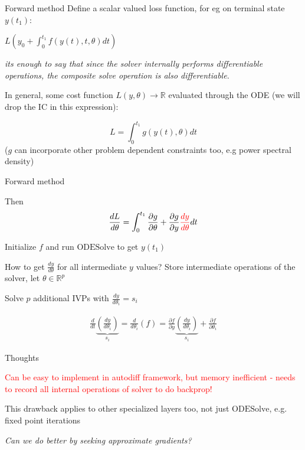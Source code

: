 \documentclass[usenames,dvipsnames]{beamer}
\theoremstyle{definition}
\begin{document}
\begin{frame}{Forward method}
    Define a scalar valued loss function, for eg on terminal state $y(t_1)$:

    $L(y_0 + \int_{0}^{t_1}f(y(t), t, \theta)dt)$

    \emph{its enough to say that since the solver internally performs differentiable operations, the composite solve operation is also differentiable.}

    In general, some cost function $L(y, \theta) \rightarrow \mathbb{R}$ evaluated through the ODE (we will drop the IC in this expression):

    $$L = \int_{0}^{t_1}g(y(t), \theta)dt$$ ($g$ can incorporate other problem dependent constraints too, e.g power spectral density)   
\end{frame}

\begin{frame}{Forward method}

    Then $$\frac{dL}{d\theta} = \int_{0}^{t_1}\frac{\partial g}{\partial \theta} + \frac{\partial g}{\partial y} \textcolor{red}{\frac{dy}{d\theta}} dt$$

    Initialize $f$ and run $\textrm{ODESolve}$ to get $y(t_1)$

    How to get $\frac{dy}{d\theta}$ for all intermediate $y$ values? Store intermediate operations of the solver, let $\theta \in \mathbb{R}^{p}$

    Solve $p$ additional IVPs with $\frac{dy}{d\theta_i} = s_i$ 

    $$\begin{aligned}\frac{d}{dt}\underbrace{\left(\frac{dy}{d\theta_i}\right)}_{s_i} = \frac{d}{d\theta_i}(f) = \frac{\partial f}{\partial y}\underbrace{\left(\frac{dy}{d\theta_i}\right)}_{s_i} + \frac{\partial f}{\partial \theta_i}\end{aligned}$$

\end{frame}

\begin{frame}{Thoughts}

    \textcolor{red}{Can be easy to implement in autodiff framework, but memory inefficient - needs to record all internal operations of solver to do backprop!}


    This drawback applies to other specialized layers too, not just $\textrm{ODESolve}$, e.g. fixed point iterations

    \emph{Can we do better by seeking approximate gradients?}

\end{frame}
\end{document}
